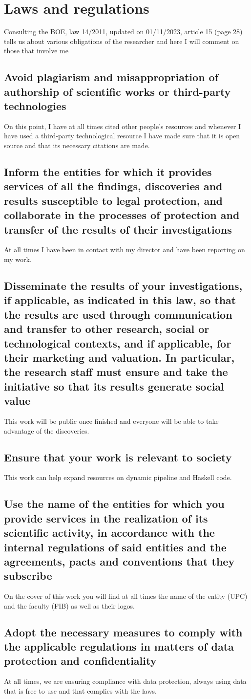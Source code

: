 \chapter{Laws and regulations}
Consulting the BOE, law 14/2011, updated on 01/11/2023, article 15 (page 28) tells us about various obligations of the researcher and here I will comment on those that involve me \cite{}
\section*{Avoid plagiarism and misappropriation of authorship of scientific works or third-party technologies}
On this point, I have at all times cited other people's resources and whenever I have used a third-party technological resource I have made sure that it is open source and that its necessary citations are made.

\section*{Inform the entities for which it provides services of all the findings, discoveries and results susceptible to legal protection, and collaborate in the processes of protection and transfer of the results of their investigations}
At all times I have been in contact with my director and have been reporting on my work.

\section*{Disseminate the results of your investigations, if applicable, as indicated in this law, so that the results are used through communication and transfer to other research, social or technological contexts, and if applicable, for their marketing and valuation. In particular, the research staff must ensure and take the initiative so that its results generate social value}
This work will be public once finished and everyone will be able to take advantage of the discoveries.

\section*{Ensure that your work is relevant to society}
This work can help expand resources on dynamic pipeline and Haskell code.

\section*{Use the name of the entities for which you provide services in the realization of its scientific activity, in accordance with the internal regulations of said entities and the agreements, pacts and conventions that they subscribe}
On the cover of this work you will find at all times the name of the entity (UPC) and the faculty (FIB) as well as their logos. 

\section*{Adopt the necessary measures to comply with the applicable regulations in matters of data protection and confidentiality}
At all times, we are ensuring compliance with data protection, always using data that is free to use and that complies with the laws.
